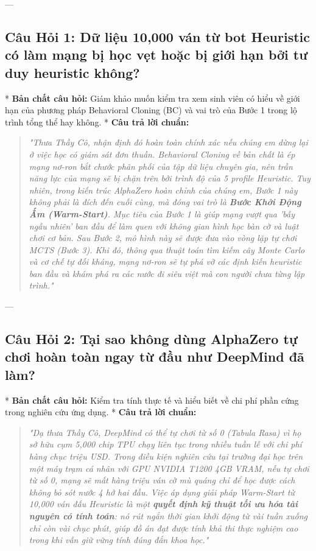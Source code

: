 \documentclass[11pt,a4paper]{report}
\begin{document}
---

\subsection*{Câu Hỏi 1: Dữ liệu 10,000 ván từ bot Heuristic có làm mạng bị học vẹt hoặc bị giới hạn bởi tư duy heuristic không?}
* \textbf{Bản chất câu hỏi:} Giám khảo muốn kiểm tra xem sinh viên có hiểu về giới hạn của phương pháp Behavioral Cloning (BC) và vai trò của Bước 1 trong lộ trình tổng thể hay không.
* \textbf{Câu trả lời chuẩn:}
  \begin{quote}
  \textit{"Thưa Thầy Cô, nhận định đó hoàn toàn chính xác nếu chúng em dừng lại ở việc học có giám sát đơn thuần. Behavioral Cloning về bản chất là ép mạng nơ-ron bắt chước phân phối của tập dữ liệu chuyên gia, nên trần năng lực của mạng sẽ bị chặn trên bởi trình độ của 5 profile Heuristic. 
  Tuy nhiên, trong kiến trúc AlphaZero hoàn chỉnh của chúng em, Bước 1 này không phải là đích đến cuối cùng, mà đóng vai trò là \textbf{Bước Khởi Động Ấm (Warm-Start)}. Mục tiêu của Bước 1 là giúp mạng vượt qua 'bẫy ngẫu nhiên' ban đầu để làm quen với không gian hình học bàn cờ và luật chơi cơ bản. Sau Bước 2, mô hình này sẽ được đưa vào vòng lặp tự chơi MCTS (Bước 3). Khi đó, thông qua thuật toán tìm kiếm cây Monte Carlo và cơ chế tự đối kháng, mạng nơ-ron sẽ tự phá vỡ các định kiến heuristic ban đầu và khám phá ra các nước đi siêu việt mà con người chưa từng lập trình."}
  \end{quote}

---

\subsection*{Câu Hỏi 2: Tại sao không dùng AlphaZero tự chơi hoàn toàn ngay từ đầu như DeepMind đã làm?}
* \textbf{Bản chất câu hỏi:} Kiểm tra tính thực tế và hiểu biết về chi phí phần cứng trong nghiên cứu ứng dụng.
* \textbf{Câu trả lời chuẩn:}
  \begin{quote}
  \textit{"Dạ thưa Thầy Cô, DeepMind có thể tự chơi từ số 0 (Tabula Rasa) vì họ sở hữu cụm 5,000 chip TPU chạy liên tục trong nhiều tuần lễ với chi phí hàng chục triệu USD. Trong điều kiện nghiên cứu tại trường đại học trên một máy trạm cá nhân với GPU NVIDIA T1200 4GB VRAM, nếu tự chơi từ số 0, mạng sẽ mất hàng triệu ván cờ mù quáng chỉ để học được cách không bỏ sót nước 4 hở hai đầu. 
  Việc áp dụng giải pháp Warm-Start từ 10,000 ván đấu Heuristic là một \textbf{quyết định kỹ thuật tối ưu hóa tài nguyên có tính toán}: nó rút ngắn thời gian khởi động từ vài tuần xuống chỉ còn vài chục phút, giúp đồ án đạt được tính khả thi thực nghiệm cao trong khi vẫn giữ vững tính đúng đắn khoa học."}
  \end{quote}
\end{document}
